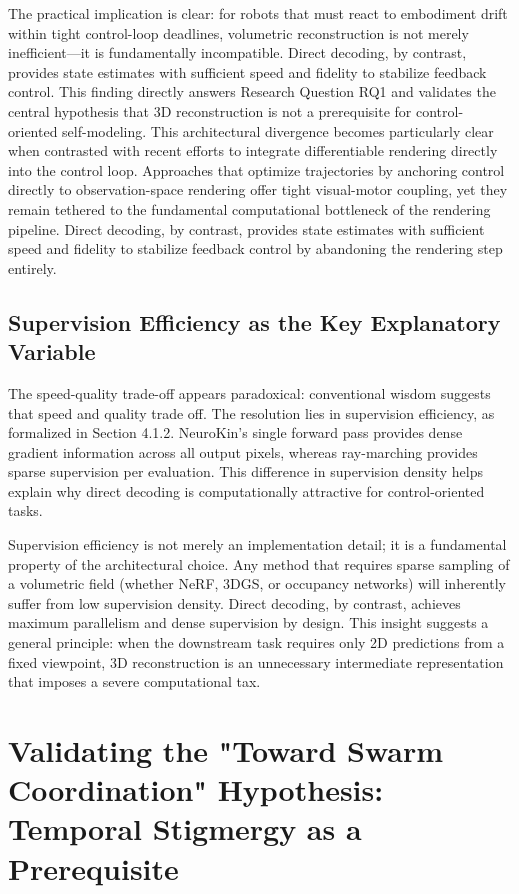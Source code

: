 \documentclass[12pt,a4paper,oneside]{report}
\begin{document}
The practical implication is clear: for robots that must react to embodiment drift within tight control-loop deadlines, volumetric reconstruction is not merely inefficient—it is fundamentally incompatible. Direct decoding, by contrast, provides state estimates with sufficient speed and fidelity to stabilize feedback control. This finding directly answers Research Question RQ1 and validates the central hypothesis that 3D reconstruction is not a prerequisite for control-oriented self-modeling. This architectural divergence becomes particularly clear when contrasted with recent efforts to integrate differentiable rendering directly into the control loop. Approaches that optimize trajectories by anchoring control directly to observation-space rendering \cite{liu2024differentiable} offer tight visual-motor coupling, yet they remain tethered to the fundamental computational bottleneck of the rendering pipeline. Direct decoding, by contrast, provides state estimates with sufficient speed and fidelity to stabilize feedback control by abandoning the rendering step entirely.

\subsection{Supervision Efficiency as the Key Explanatory Variable}

The speed-quality trade-off appears paradoxical: conventional wisdom suggests that speed and quality trade off. The resolution lies in supervision efficiency, as formalized in Section 4.1.2. NeuroKin's single forward pass provides dense gradient information across all output pixels, whereas ray-marching provides sparse supervision per evaluation. This difference in supervision density helps explain why direct decoding is computationally attractive for control-oriented tasks.

Supervision efficiency is not merely an implementation detail; it is a fundamental property of the architectural choice. Any method that requires sparse sampling of a volumetric field (whether NeRF, 3DGS, or occupancy networks) will inherently suffer from low supervision density. Direct decoding, by contrast, achieves maximum parallelism and dense supervision by design. This insight suggests a general principle: when the downstream task requires only 2D predictions from a fixed viewpoint, 3D reconstruction is an unnecessary intermediate representation that imposes a severe computational tax.

\section{Validating the "Toward Swarm Coordination" Hypothesis: Temporal Stigmergy as a Prerequisite}
\end{document}
